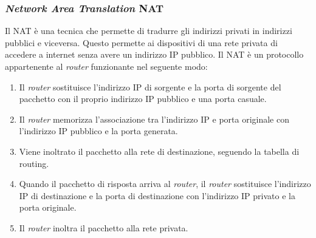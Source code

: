         \subsubsection{\textit{Network Area Translation} \Acrshort*{NAT}}
            Il \Acrshort*{NAT} è una tecnica che permette di tradurre gli indirizzi privati in indirizzi pubblici e viceversa. Questo permette ai dispositivi di una rete privata di accedere a internet senza avere un indirizzo \Acrshort*{IP} pubblico. Il \Acrshort*{NAT} è un protocollo appartenente al \textit{router} funzionante nel seguente modo:
            \begin{enumerate}
                \item Il \textit{router} sostituisce l'indirizzo \Acrshort*{IP} di sorgente e la porta di sorgente del pacchetto con il proprio indirizzo \Acrshort*{IP} pubblico e una porta casuale.
                \item Il \textit{router} memorizza l'associazione tra l'indirizzo \Acrshort*{IP} e porta originale con l'indirizzo \Acrshort*{IP} pubblico e la porta generata.
                \item Viene inoltrato il pacchetto alla rete di destinazione, seguendo la tabella di routing.
                \item Quando il pacchetto di risposta arriva al \textit{router}, il \textit{router} sostituisce l'indirizzo \Acrshort*{IP} di destinazione e la porta di destinazione con l'indirizzo \Acrshort*{IP} privato e la porta originale.
                \item Il \textit{router} inoltra il pacchetto alla rete privata.
            \end{enumerate}
